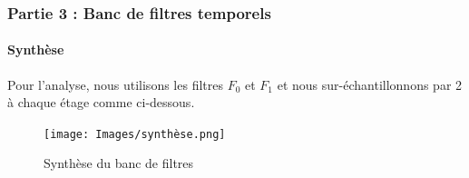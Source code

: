 \documentclass[
10pt,
aspectratio=169,
]{beamer}
\begin{document}
\begin{frame}
\frametitle{Partie 3 : Banc de filtres temporels} 
\framesubtitle{Synthèse}
Pour l'analyse, nous utilisons les filtres $F_0$ et $F_1$ et nous sur-échantillonnons par 2 à chaque étage comme ci-dessous.
\begin{figure}
    \centering
    \texttt{[image: Images/synthèse.png]}
    \caption{Synthèse du banc de filtres}
\end{figure}
\end{frame}
\end{document}
